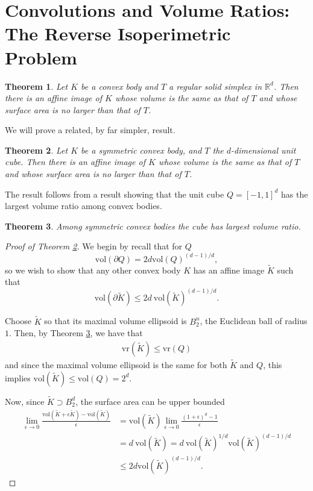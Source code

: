 \documentclass{article}
\newcommand{\Reals}{\mathbb{R}}
\newcommand{\vol}{\mathrm{vol}}
\newcommand{\vr}{\mathrm{vr}}
\newcommand{\wt}[1]{\widetilde{#1}}
\newcommand{\Rd}{\Reals^d}
\theoremstyle{alden}
\theoremstyle{aldenthm}
\newtheorem{theorem}{Theorem}
\theoremstyle{remark}
\begin{document}
\section{Convolutions and Volume Ratios: The Reverse Isoperimetric Problem}

\begin{theorem}
	Let $K$ be a convex body and $T$ a regular solid simplex in $\Rd$. Then there is an affine image of $K$ whose volume is the same as that of $T$ and whose surface area is no larger than that of $T$. 
\end{theorem}

We will prove a related, by far simpler, result.

\begin{theorem}
	\label{thm: reverse_isoperimetry_symmetric_bodies}
	Let $K$ be a symmetric convex body, and $T$ the $d$-dimensional unit cube. Then there is an affine image of $K$ whose volume is the same as that of $T$ and whose surface area is no larger than that of $T$.
\end{theorem}

The result follows from a result showing that the unit cube $Q = [-1,1]^d$ has the largest volume ratio among convex bodies.
\begin{theorem}
	\label{thm: volume_ratio_symmetric_bodies}
	Among symmetric convex bodies the cube has largest volume ratio.
\end{theorem}

\begin{proof}[Proof of Theorem \ref{thm: reverse_isoperimetry_symmetric_bodies}]
	We begin by recall that for $Q$
	\begin{equation*}
	\vol(\partial Q) = 2d \vol(Q)^{(d-1)/d},
	\end{equation*}
	so we wish to show that any other convex body $K$ has an affine image $\wt{K}$ such that
	\begin{equation*}
	\vol(\partial \wt{K}) \leq 2d ~ \vol(\wt{K})^{(d-1)/d}.
	\end{equation*}
	
	Choose $\wt{K}$ so that its maximal volume ellipsoid is $B_2^n$, the Euclidean ball of radius $1$. Then, by Theorem \ref{thm: volume_ratio_symmetric_bodies}, we have that
	\begin{align*}
	\vr(\wt{K}) \leq \vr(Q)
	\end{align*}
	and since the maximal volume ellipsoid is the same for both $\wt{K}$ and $Q$, this implies $\vol(\wt{K}) \leq \vol(Q) = 2^d$.
	
	Now, since $\wt{K} \supset B_2^d$, the surface area can be upper bounded
	\begin{align*}
	\lim_{\epsilon \to 0} \frac{\vol(\wt{K} + \epsilon \wt{K}) - \vol(\wt{K})}{\epsilon} & = \vol(\wt{K}) \lim_{\epsilon \to 0} \frac{(1 + \epsilon)^d - 1}{\epsilon} \\
	& = d ~ \vol(\wt{K}) = d ~ \vol(\wt{K})^{1/d} \vol(\wt{K})^{(d-1)/d}  \\
	& \leq 2d \vol(\wt{K})^{(d-1)/d}.
	\end{align*}
\end{proof}
\end{document}
